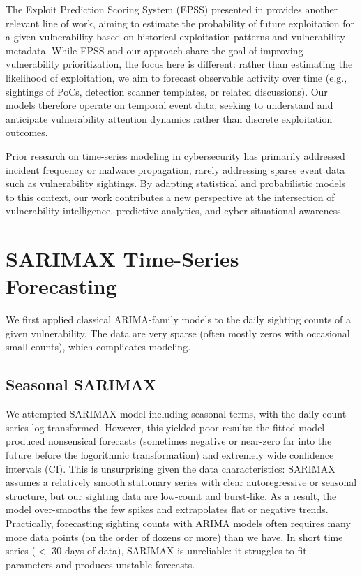 \documentclass[]{article}
\begin{document}
The Exploit Prediction Scoring System (EPSS) presented in \cite{jacobs2023enhancingvulnerabilityprioritizationdatadriven} provides another relevant line of work, aiming to estimate the probability of future exploitation for a given vulnerability based on historical exploitation patterns and vulnerability metadata. While EPSS and our approach share the goal of improving vulnerability prioritization, the focus here is different: rather than estimating the likelihood of exploitation, we aim to forecast observable activity over time (e.g., sightings of PoCs, detection scanner templates, or related discussions). Our models therefore operate on temporal event data, seeking to understand and anticipate vulnerability attention dynamics rather than discrete exploitation outcomes.

Prior research on time-series modeling in cybersecurity has primarily addressed incident frequency or malware propagation, rarely addressing sparse event data such as vulnerability sightings. By adapting statistical and probabilistic models to this context, our work contributes a new perspective at the intersection of vulnerability intelligence, predictive analytics, and cyber situational awareness.


\section{SARIMAX Time-Series Forecasting}
We first applied classical ARIMA-family models to the daily sighting counts of a given vulnerability. The data are very sparse (often mostly zeros with occasional small counts), which complicates modeling.

\subsection{Seasonal SARIMAX}
We attempted SARIMAX model including seasonal terms, with the daily count series log-transformed. However, this yielded poor results: the fitted model produced nonsensical forecasts (sometimes negative or near-zero far into the future before the logorithmic transformation) and extremely wide confidence intervals (CI). This is unsurprising given the data characteristics: SARIMAX assumes a relatively smooth stationary series with clear autoregressive or seasonal structure, but our sighting data are low-count and burst-like. As a result, the model over-smooths the few spikes and extrapolates flat or negative trends. Practically, forecasting sighting counts with ARIMA models often requires many more data points (on the order of dozens or more) than we have. In short time series ($<$ 30 days of data), SARIMAX is unreliable: it struggles to fit parameters and produces unstable forecasts.
\end{document}
